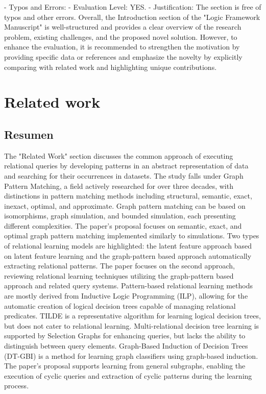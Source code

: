 \documentclass{article}%
\begin{document}
\newline%
{-} Typos and Errors:\newline%
  {-} Evaluation Level: YES.\newline%
  {-} Justification: The section is free of typos and other errors.\newline%
\newline%
Overall, the Introduction section of the "Logic Framework Manuscript" is well{-}structured and provides a clear overview of the research problem, existing challenges, and the proposed novel solution. However, to enhance the evaluation, it is recommended to strengthen the motivation by providing specific data or references and emphasize the novelty by explicitly comparing with related work and highlighting unique contributions.

%
\section{Related work}%
\label{sec:Relatedwork}%
\subsection{Resumen}%
\label{subsec:Resumen}%
The "Related Work" section discusses the common approach of executing relational queries by developing patterns in an abstract representation of data and searching for their occurrences in datasets. The study falls under Graph Pattern Matching, a field actively researched for over three decades, with distinctions in pattern matching methods including structural, semantic, exact, inexact, optimal, and approximate. Graph pattern matching can be based on isomorphisms, graph simulation, and bounded simulation, each presenting different complexities. The paper's proposal focuses on semantic, exact, and optimal graph pattern matching implemented similarly to simulations.\newline%
\newline%
Two types of relational learning models are highlighted: the latent feature approach based on latent feature learning and the graph{-}pattern based approach automatically extracting relational patterns. The paper focuses on the second approach, reviewing relational learning techniques utilizing the graph{-}pattern based approach and related query systems.\newline%
\newline%
Pattern{-}based relational learning methods are mostly derived from Inductive Logic Programming (ILP), allowing for the automatic creation of logical decision trees capable of managing relational predicates. TILDE is a representative algorithm for learning logical decision trees, but does not cater to relational learning. Multi{-}relational decision tree learning is supported by Selection Graphs for enhancing queries, but lacks the ability to distinguish between query elements. Graph{-}Based Induction of Decision Trees (DT{-}GBI) is a method for learning graph classifiers using graph{-}based induction. The paper's proposal supports learning from general subgraphs, enabling the execution of cyclic queries and extraction of cyclic patterns during the learning process.
\end{document}
